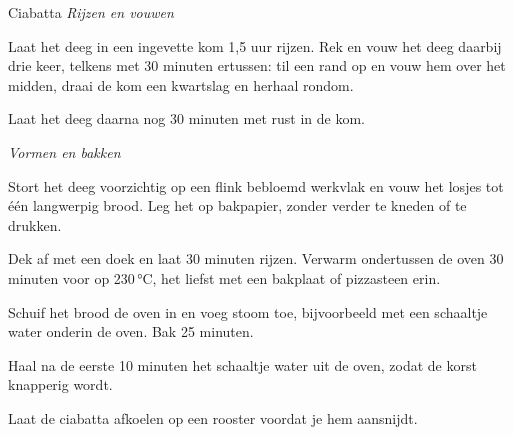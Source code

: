 \begin{recipe}{Ciabatta}
\medskip
\noindent\textit{Rijzen en vouwen}
\begin{steps}
  \item Laat het deeg in een ingevette kom 1,5 uur rijzen. Rek en vouw het
        deeg daarbij drie keer, telkens met 30 minuten ertussen: til een rand
        op en vouw hem over het midden, draai de kom een kwartslag en herhaal
        rondom.
  \item Laat het deeg daarna nog 30 minuten met rust in de kom.
\end{steps}

\medskip
\noindent\textit{Vormen en bakken}
\begin{steps}
  \item Stort het deeg voorzichtig op een flink bebloemd werkvlak en vouw het
        losjes tot één langwerpig brood. Leg het op bakpapier, zonder verder
        te kneden of te drukken.
  \item Dek af met een doek en laat 30 minuten rijzen. Verwarm ondertussen de
        oven 30 minuten voor op 230\,°C, het liefst met een bakplaat of
        pizzasteen erin.
  \item Schuif het brood de oven in en voeg stoom toe, bijvoorbeeld met een
        schaaltje water onderin de oven. Bak 25 minuten.
  \item Haal na de eerste 10 minuten het schaaltje water uit de oven, zodat de
        korst knapperig wordt.
  \item Laat de ciabatta afkoelen op een rooster voordat je hem aansnijdt.
\end{steps}

\end{recipe}
